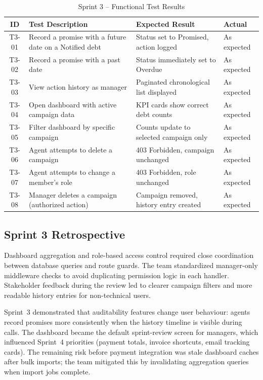 \documentclass[12pt,a4paper]{report}
\newcommand{\reporttablesetup}{%
  \small%
  \setlength{\tabcolsep}{5pt}%
  \renewcommand{\arraystretch}{1.22}%
  \arrayrulecolor{framegray}%
}
\begin{document}
\begin{table}[!htbp]
  \centering
  \footnotesize\reporttablesetup
  \begin{tabularx}{\textwidth}{|c|Y|p{3.85cm}|p{1.8cm}|}
    \hline
    \textbf{ID} & \textbf{Test Description} & \textbf{Expected Result}
      & \textbf{Actual} \\
    \hline
    T3-01 & Record a promise with a future date on a Notified debt &
      Status set to Promised, action logged & As expected \\
    \hline
    T3-02 & Record a promise with a past date &
      Status immediately set to Overdue & As expected \\
    \hline
    T3-03 & View action history as manager &
      Paginated chronological list displayed & As expected \\
    \hline
    T3-04 & Open dashboard with active campaign data &
      KPI cards show correct debt counts & As expected \\
    \hline
    T3-05 & Filter dashboard by specific campaign &
      Counts update to selected campaign only & As expected \\
    \hline
    T3-06 & Agent attempts to delete a campaign &
      403 Forbidden, campaign unchanged & As expected \\
    \hline
    T3-07 & Agent attempts to change a member's role &
      403 Forbidden, role unchanged & As expected \\
    \hline
    T3-08 & Manager deletes a campaign (authorized action) &
      Campaign removed, history entry created & As expected \\
    \hline
  \end{tabularx}
  \caption{Sprint 3 -- Functional Test Results}
  \label{tab:test-s3}
\end{table}

\subsection{Sprint 3 Retrospective}

Dashboard aggregation and role-based access control required close coordination
between database queries and route guards.
The team standardized manager-only middleware checks to avoid duplicating permission
logic in each handler.
Stakeholder feedback during the review led to clearer campaign filters and more
readable history entries for non-technical users.

Sprint~3 demonstrated that auditability features change user behaviour: agents record
promises more consistently when the history timeline is visible during calls.
The dashboard became the default sprint-review screen for managers, which influenced
Sprint~4 priorities (payment totals, invoice shortcuts, email tracking cards).
The remaining risk before payment integration was stale dashboard caches after bulk
imports; the team mitigated this by invalidating aggregation queries when import jobs
complete.
\end{document}
